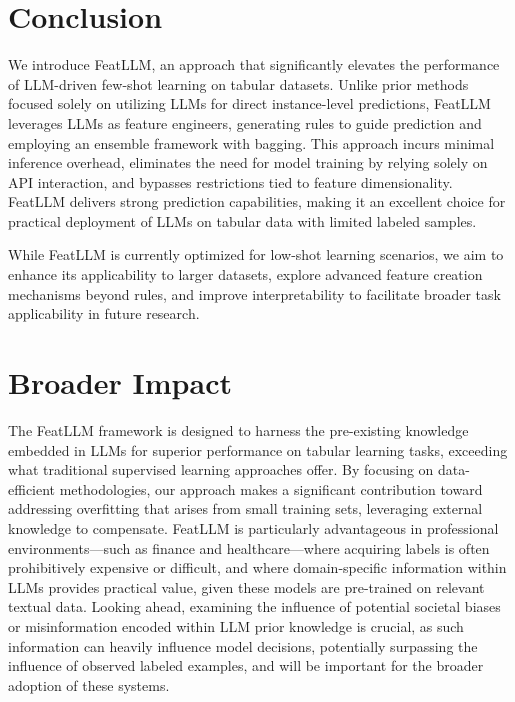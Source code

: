 \section{Conclusion}
We introduce \textsf{FeatLLM}, an approach that significantly elevates the performance of LLM-driven few-shot learning on tabular datasets. Unlike prior methods focused solely on utilizing LLMs for direct instance-level predictions, \textsf{FeatLLM} leverages LLMs as feature engineers, generating rules to guide prediction and employing an ensemble framework with bagging. This approach incurs minimal inference overhead, eliminates the need for model training by relying solely on API interaction, and bypasses restrictions tied to feature dimensionality. \textsf{FeatLLM} delivers strong prediction capabilities, making it an excellent choice for practical deployment of LLMs on tabular data with limited labeled samples.

While \textsf{FeatLLM} is currently optimized for low-shot learning scenarios, we aim to enhance its applicability to larger datasets, explore advanced feature creation mechanisms beyond rules, and improve interpretability to facilitate broader task applicability in future research.

\section{Broader Impact} 
The \textsf{FeatLLM} framework is designed to harness the pre-existing knowledge embedded in LLMs for superior performance on tabular learning tasks, exceeding what traditional supervised learning approaches offer. By focusing on data-efficient methodologies, our approach makes a significant contribution toward addressing overfitting that arises from small training sets, leveraging external knowledge to compensate. \textsf{FeatLLM} is particularly advantageous in professional environments—such as finance and healthcare—where acquiring labels is often prohibitively expensive or difficult, and where domain-specific information within LLMs provides practical value, given these models are pre-trained on relevant textual data. Looking ahead, examining the influence of potential societal biases or misinformation encoded within LLM prior knowledge is crucial, as such information can heavily influence model decisions, potentially surpassing the influence of observed labeled examples, and will be important for the broader adoption of these systems.

